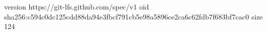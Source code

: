 version https://git-lfs.github.com/spec/v1
oid sha256:c594c0dc125cdd88da94e3fbcf791cb5e98a5896ce2ca6c62fdb7f683bf7cac0
size 124
